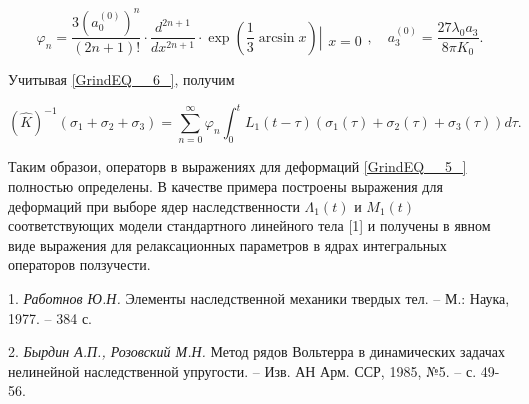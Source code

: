 \[\varphi _{n} =\frac{3(a_{0}^{(0)} )^{n} }{(2n+1)!} \cdot \frac{d^{2n+1} }{dx^{2n+1} } \cdot \exp \left(\frac{1}{3} \arcsin x\right)\left|\begin{array}{l} {} \\ {x=0} \end{array}\right. ,\quad a_{3}^{(0)} =\frac{27\lambda _{0} a_{3} }{8\pi K_{0} } .\]

Учитывая  \eqref{GrindEQ__6_},  получим

\[(\hat{K})^{-1} (\sigma _{1} +\sigma _{2} +\sigma _{3} )=\sum _{n=0}^{\infty }\varphi _{n}  \int _{0}^{t}L_{1}  (t-\tau )(\sigma _{1} (\tau )+\sigma _{2} (\tau )+\sigma _{3} (\tau ))d\tau .\]

Таким образои, операторв в выражениях для деформаций \eqref{GrindEQ__5_} полностью определены. В качестве примера построены выражения для деформаций при выборе ядер наследственности $\Lambda _{1} (t)$ и $M_{1} (t)$ соответствующих модели стандартного линейного тела  [1] и получены в явном виде выражения для релаксационных параметров в ядрах интегральных операторов ползучести.

\litlist

1.
{\it Работнов Ю.Н.} Элементы наследственной механики твердых тел. -- М.: Наука, 1977. -- 384 с.

2.
{\it Бырдин А.П., Розовский М.Н.} Метод рядов Вольтерра в динамических задачах  нелинейной наследственной упругости.  -- Изв. АН Арм. ССР, 1985, №5. -- с. 49-56.









